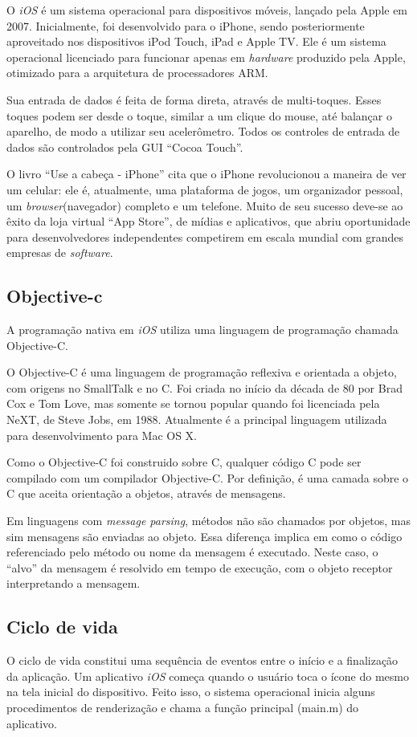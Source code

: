  O \emph{iOS} é um sistema operacional para dispositivos móveis, lançado pela Apple em 2007. Inicialmente, foi desenvolvido para o iPhone, sendo posteriormente aproveitado nos dispositivos iPod Touch, iPad e Apple TV. Ele é um sistema operacional licenciado para funcionar apenas em \emph{hardware} produzido pela Apple, otimizado para a arquitetura de processadores ARM.
 
 Sua entrada de dados é feita de forma direta, através de multi-toques. Esses toques podem ser desde o toque, similar a um clique do mouse, até balançar o aparelho, de modo a utilizar seu acelerômetro. Todos os controles de entrada de dados são controlados pela \ac{GUI} ``Cocoa Touch''.
 
 O livro ``Use a cabeça - iPhone'' \cite{usecabecaiphone} cita que o iPhone revolucionou a maneira de ver um celular: ele é, atualmente, uma plataforma de jogos, um organizador pessoal, um \emph{browser}(navegador) completo e um telefone. Muito de seu sucesso deve-se ao êxito da loja virtual ``App Store'', de mídias e aplicativos, que abriu oportunidade para desenvolvedores independentes competirem em escala mundial com grandes empresas de \emph{software}. 

 \subsection{Objective-c}
 A programação nativa em \emph{iOS} utiliza uma linguagem de programação chamada Objective-C. 
 
 O Objective-C é uma linguagem de programação reflexiva e orientada a objeto, com origens no SmallTalk e no C. Foi criada no início da década de 80 por Brad Cox e Tom Love, mas somente se tornou popular quando foi licenciada pela NeXT, de Steve Jobs, em 1988. Atualmente é a principal linguagem utilizada para desenvolvimento para Mac OS X.
 
 Como o Objective-C foi construido sobre C, qualquer código C pode ser compilado com um compilador Objective-C. Por definição, é uma camada sobre o C que aceita orientação a objetos, através de mensagens.
 
 Em linguagens com \emph{message parsing}, métodos não são chamados por objetos, mas sim mensagens são enviadas ao objeto. Essa diferença implica em como o código referenciado pelo método ou nome da mensagem é executado. Neste caso, o ``alvo'' da mensagem é resolvido em tempo de execução, com o objeto receptor interpretando a mensagem.

 \subsection{Ciclo de vida}
 O ciclo de vida constitui uma sequência de eventos entre o início e a finalização da aplicação. Um aplicativo \emph{iOS} começa quando o usuário toca o ícone do mesmo na tela inicial do dispositivo. Feito isso, o sistema operacional inicia alguns procedimentos de renderização e chama a função principal (main.m) do aplicativo.
 
